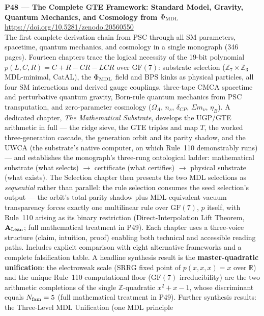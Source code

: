 \documentclass[11pt]{article}
\newcommand{\CatAL}{\ensuremath{\textbf{A}_{\rm Lean}}}
\begin{document}
\medskip
\noindent\textbf{P48 — The Complete GTE Framework: Standard Model, Gravity, Quantum Mechanics, and Cosmology from $\Phi_{\rm MDL}$}~\cite{SpivackGTECompleteFramework}\\
\url{https://doi.org/10.5281/zenodo.20560550}\\
The first complete derivation chain from PSC through all SM parameters, spacetime,
quantum mechanics, and cosmology in a single monograph (346 pages).
Fourteen chapters trace the logical necessity of the 19-bit polynomial
$p(L,C,R) = C + R - CR - LCR$ over $\mathrm{GF}(7)$: substrate selection
($\mathbb{Z}_7 \times \mathbb{Z}_3$ MDL-minimal, CatAL), the $\Phi_{\rm MDL}$ field
and BPS kinks as physical particles, all four SM interactions and derived gauge
couplings, three-tape CMCA spacetime and perturbative quantum gravity, Born-rule
quantum mechanics from PSC transputation, and zero-parameter cosmology
($\Omega_\Lambda$, $n_s$, $\delta_{CP}$, $\Sigma m_\nu$, $\eta_B$).
A dedicated chapter, \emph{The Mathematical Substrate}, develops the UGP/GTE
arithmetic in full --- the ridge sieve, the GTE triples and map $T$, the worked
three-generation cascade, the generation orbit and its parity shadow, and the
UWCA (the substrate's native computer, on which Rule~110 demonstrably runs) ---
and establishes the monograph's three-rung ontological ladder: mathematical
substrate (what selects) $\to$ certificate (what certifies) $\to$ physical
substrate (what exists).
The Selection chapter then presents the two MDL selections as \emph{sequential}
rather than parallel: the rule selection consumes the seed selection's output ---
the orbit's total-parity shadow plus MDL-equivalent vacuum transparency forces
exactly one multilinear rule over $\mathrm{GF}(7)$, $p$ itself, with Rule~110
arising as its binary restriction (Direct-Interpolation Lift Theorem, $\CatAL$;
full mathematical treatment in P49).
Each chapter uses a three-voice structure (claim, intuition, proof) enabling both
technical and accessible reading paths.
Includes explicit comparison with eight alternative frameworks and a complete
falsification table.
A headline synthesis result is the \textbf{master-quadratic unification}: the
electroweak scale (SRRG fixed point of $p(x,x,x)=x$ over $\mathbb{R}$) and the
unique Rule~110 computational floor ($\mathrm{GF}(7)$ irreducibility) are the two
arithmetic completions of the single $\mathbb{Z}$-quadratic $x^2+x-1$, whose
discriminant equals $N_{\rm fam} = 5$ (full mathematical treatment in P49).
Further synthesis results: the Three-Level MDL Unification (one MDL principle
\end{document}
